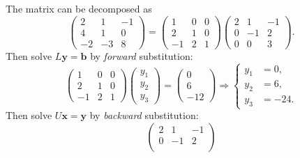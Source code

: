 \documentclass{beamer}
\newcommand{\bb}{{\boldsymbol{b}}}
\newcommand{\bx}{{\boldsymbol{x}}}
\newcommand{\by}{{\boldsymbol{y}}}
\begin{document}
\begin{frame}
\begin{overlayarea}{\textwidth}{0.8\textheight}
{      The matrix can be decomposed as
      \begin{equation*}
        \begin{pmatrix}
          2 & 1 & -1 \\
          4 & 1 & 0 \\
          -2 & -3 & 8
        \end{pmatrix}
        =
        \begin{pmatrix}
          1 & 0 & 0 \\
          2 & 1 & 0 \\
          -1 & 2 & 1
        \end{pmatrix}
        \begin{pmatrix}
          2 & 1 & -1 \\
          0 & -1 & 2 \\
          0 & 0 & 3
        \end{pmatrix}.
      \end{equation*}
    }
    {
      Then solve $L \by = \bb$ by \emph{forward} substitution:
      \begin{equation*}
        \begin{pmatrix}
          1 & 0 & 0 \\
          2 & 1 & 0 \\
          -1 & 2 & 1
        \end{pmatrix}
        \begin{pmatrix}
          y_1 \\ y_2 \\ y_3
        \end{pmatrix} =
        \begin{pmatrix}
          0 \\ 6 \\ -12
        \end{pmatrix}
        \Rightarrow \left\{
          \begin{aligned}
            y_1 & = 0, \\
            y_2 & = 6, \\
            y_3 & = -24.
          \end{aligned}
        \right.
      \end{equation*}
    }
    {
      Then solve $U \bx = \by$ by \emph{backward} substitution:
    \begin{equation*}
      \begin{pmatrix}
        2 & 1 & -1 \\
        0 & -1 & 2 \\

\end{pmatrix}
\end{equation*}}
\end{overlayarea}
\end{frame}
\end{document}

